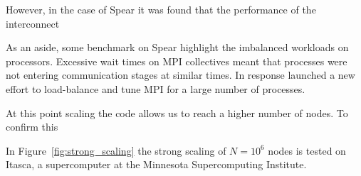 \documentclass{report}
\begin{document}
However, in the case of Spear it was found that the performance of the interconnect


As an aside, some benchmark on Spear highlight the imbalanced workloads on processors. Excessive wait times on MPI collectives meant that processes were not entering communication stages at similar times. In response launched a new effort to load-balance and tune MPI for a large number of processes.

At this point scaling the code allows us to reach a higher number of nodes. To confirm this  




%


In Figure~\ref{fig:strong_scaling} the strong scaling of $N=10^6$ nodes is tested on Itasca, a supercomputer at the Minnesota Supercomputing Institute.   
\end{document}
